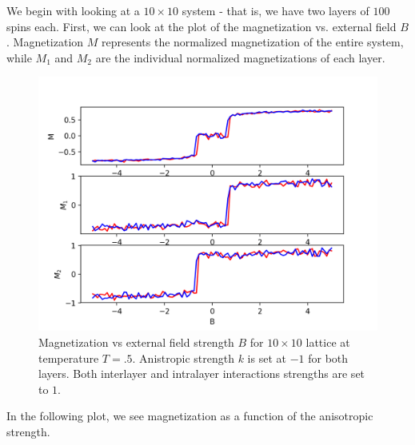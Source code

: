 \documentclass{article}
\begin{document}
We begin with looking at a $10\times 10$ system - that is, we have two layers of $100$ spins each. First,
we can look at the plot of the magnetization vs. external field $B$. Magnetization $M$ represents the normalized magnetization of the entire system, while $M_{1}$
and $M_{2}$ are the individual normalized magnetizations of each layer.


\begin{figure}

  \includegraphics[width=\textwidth]{figures/magvb_anneal1.png}

\caption{Magnetization vs external field strength $B$ for $10 \times 10$ lattice at temperature $T = .5$. Anistropic
strength $k$ is set at $-1$ for both layers. Both interlayer and intralayer interactions strengths are set to $1$.}
\end{figure}

In the following plot, we see magnetization as a function of the anisotropic strength.
\end{document}
